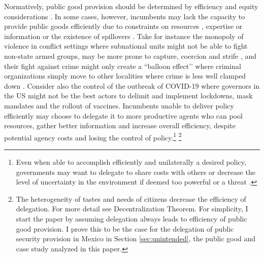 \documentclass[12pt]{amsart}
\numberwithin{equation}{section}
\theoremstyle{definition}
\theoremstyle{definition}
\theoremstyle{definition}
\begin{document}
Normatively, public good provision should be determined by efficiency and equity considerations \citep{oates_1972, Musgrave_1959, Musgrave_1983, gramlich_1977}. In some cases, however, incumbents may lack the capacity to provide public goods efficiently due to constraints on resources \citep{Moravcsik_2000}, expertise or information \citet{Rodrick_1996} or the existence of spillovers \citep{oates_1972,  Besley_case_1995}. Take for instance the monopoly of violence in conflict settings where subnational units might not be able to fight non-state armed groups, may be more prone to capture, coercion and strife \citet{chacon_2018}, and their fight against crime might only create a ``balloon effect’’ where criminal organizations simply move to other localities where crime is less well clamped down \citep{shirk_wallman_2015}. Consider also the control of the outbreak of COVID-19 where governors in the US might not be the best actors to delimit and implement lockdowns, mask mandates and the rollout of vaccines. Incumbents unable to deliver policy efficiently may choose to delegate it to more productive agents who can pool resources, gather better information and increase overall efficiency, despite potential agency costs and losing the control of policy.\footnote{Even when able to accomplish efficiently and unilaterally a desired policy, governments may want to delegate to share costs with others \citep{Moravcsik_2000} or decrease the level of uncertainty in the environment if deemed too powerful or a threat \citep{lake_2009, milner_2011}.} \footnote{The heterogeneity of tastes and needs of citizens decrease the efficiency of delegation. For more detail see \citet{oates_1972} Decentralization Theorem. For simplicity, I start the paper by assuming delegation always leads to efficiency of public good provision. I prove this to be the case for the delegation of public security provision in Mexico in Section \ref{sec:unintended}, the public good and case study analyzed in this paper.} 
         
\end{document}
